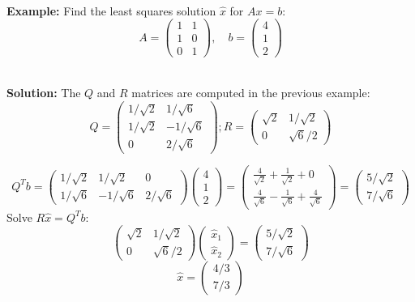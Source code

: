 \documentclass[DIV=20,oneside]{scrartcl}
\newcommand{\solution}{
	\noindent\textbf{\\Solution: }
}
\newcommand{\example}{
	\noindent\textbf{\\Example: }
}
\begin{document}
\example Find the least squares solution $\hat{x}$ for $Ax = b$: $$A = \begin{pmatrix} 1 & 1 \\ 1 & 0 \\ 0 & 1 \end{pmatrix}, \quad b = \begin{pmatrix} 4 \\ 1 \\ 2 \end{pmatrix}$$
\solution The $Q$ and $R$ matrices are computed in the previous example:
$$Q=\begin{pmatrix} 1/\sqrt{2} & 1/\sqrt{6} \\ 1/\sqrt{2} & -1/\sqrt{6} \\ 0 & 2/\sqrt{6} \end{pmatrix}; R=\begin{pmatrix} \sqrt{2} & 1/\sqrt{2} \\ 0 & \sqrt{6}/2 \end{pmatrix}$$

$$Q^T b = \begin{pmatrix} 1/\sqrt{2} & 1/\sqrt{2} & 0 \\ 1/\sqrt{6} & -1/\sqrt{6} & 2/\sqrt{6} \end{pmatrix} \begin{pmatrix} 4 \\ 1 \\ 2 \end{pmatrix} = \begin{pmatrix} \frac{4}{\sqrt{2}} + \frac{1}{\sqrt{2}} + 0 \\ \frac{4}{\sqrt{6}} - \frac{1}{\sqrt{6}} + \frac{4}{\sqrt{6}} \end{pmatrix} = \begin{pmatrix} 5/\sqrt{2} \\ 7/\sqrt{6} \end{pmatrix}$$
Solve $R \hat{x} = Q^T b$:$$\begin{pmatrix} \sqrt{2} & 1/\sqrt{2} \\ 0 & \sqrt{6}/2 \end{pmatrix} \begin{pmatrix} \hat{x}_1 \\ \hat{x}_2 \end{pmatrix} = \begin{pmatrix} 5/\sqrt{2} \\ 7/\sqrt{6} \end{pmatrix}$$
$$\hat{x} = \begin{pmatrix} 4/3 \\ 7/3 \end{pmatrix}$$
\end{document}
